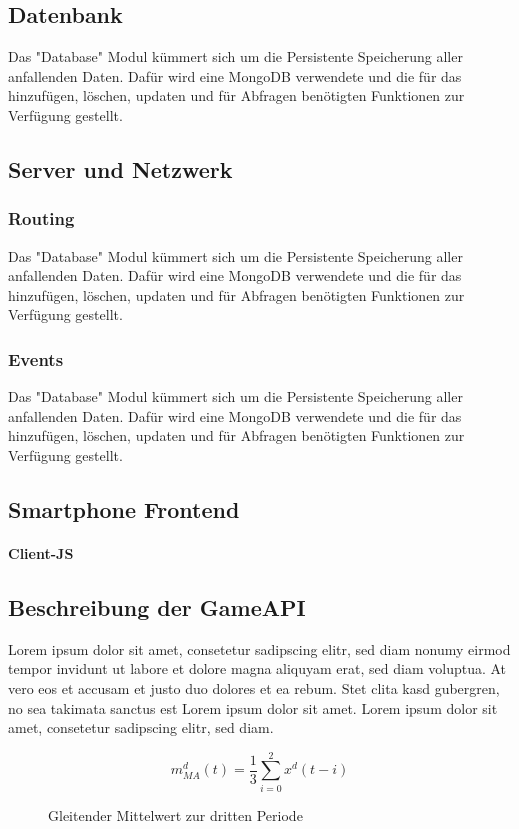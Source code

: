 \documentclass[a4paper]{spie}  %
\begin{document}
\subsection{Datenbank} %
Das "Database" Modul kümmert sich um die Persistente Speicherung aller anfallenden Daten. Dafür wird eine MongoDB verwendete und die für das hinzufügen, löschen, updaten und für Abfragen benötigten Funktionen zur Verfügung gestellt.

\subsection{Server und Netzwerk} %
\subsubsection{Routing}
Das "Database" Modul kümmert sich um die Persistente Speicherung aller anfallenden Daten. Dafür wird eine MongoDB verwendete und die für das hinzufügen, löschen, updaten und für Abfragen benötigten Funktionen zur Verfügung gestellt.
\subsubsection{Events}
Das "Database" Modul kümmert sich um die Persistente Speicherung aller anfallenden Daten. Dafür wird eine MongoDB verwendete und die für das hinzufügen, löschen, updaten und für Abfragen benötigten Funktionen zur Verfügung gestellt.

\subsection{Smartphone Frontend}
\paragraph{Client-JS} %

\subsection{Beschreibung der GameAPI} %
Lorem ipsum dolor sit amet, consetetur sadipscing elitr, sed diam nonumy eirmod tempor invidunt ut labore et dolore magna aliquyam erat, sed diam voluptua. At vero eos et accusam et justo duo dolores et ea rebum. Stet clita kasd gubergren, no sea takimata sanctus est Lorem ipsum dolor sit amet. Lorem ipsum dolor sit amet, consetetur sadipscing elitr, sed diam.
\begin{figure}
\begin{equation}
  \boxed{{ m }_{ MA }^{ d }(t) = \frac { 1 }{ 3 } \sum _{ i=0 }^{ 2 }{ { x }^{ d }(t-i) }}
\end{equation}
\caption{Gleitender Mittelwert zur dritten Periode}
\label{eqn:middle}
\end{figure}
\end{document}
